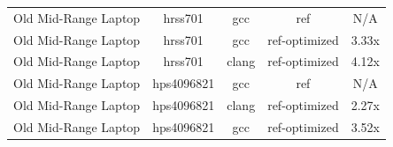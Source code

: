 \begin{table}
\begin{tabularx}{\linewidth}{X c c c c}
        Old Mid-Range Laptop &              hrss701 &                  gcc &                  ref &                  N/A\\
        Old Mid-Range Laptop &              hrss701 &                  gcc &        ref-optimized &                3.33x\\
        Old Mid-Range Laptop &              hrss701 &                clang &        ref-optimized &                4.12x\\
        Old Mid-Range Laptop &           hps4096821 &                  gcc &                  ref &                  N/A\\
        Old Mid-Range Laptop &           hps4096821 &                clang &        ref-optimized &                2.27x\\
        Old Mid-Range Laptop &           hps4096821 &                  gcc &        ref-optimized &                3.52x\\
        \bottomrule
    \end{tabularx}
\end{table}

